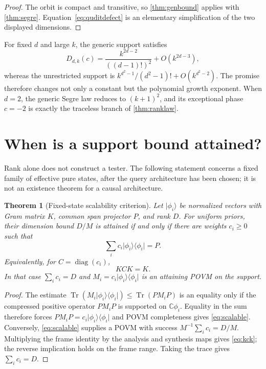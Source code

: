 \documentclass[11pt]{article}
\newtheorem{theorem}{Theorem}[section]
\theoremstyle{definition}
\theoremstyle{remark}
\newcommand{\C}{\mathbb C}
\newcommand{\Tr}{\operatorname{Tr}}
\newcommand{\ket}[1]{\lvert #1\rangle}
\newcommand{\bra}[1]{\langle #1\rvert}
\begin{document}
\begin{proof}
The orbit is compact and transitive, so \cref{thm:genbound} applies with
\cref{thm:segre}.  Equation~\eqref{eq:quditdefect} is an elementary
simplification of the two displayed dimensions.
\end{proof}

For fixed $d$ and large $k$, the generic support satisfies
\begin{equation}
 D_{d,k}(c)=\frac{k^{2d-2}}{((d-1)!)^2}+O(k^{2d-3}),
\end{equation}
whereas the unrestricted support is
$k^{d^2-1}/(d^2-1)!+O(k^{d^2-2})$.  The promise therefore changes not only a
constant but the polynomial growth exponent.  When $d=2$, the generic Segre
law reduces to $(k+1)^2$, and its exceptional phase $c=-2$ is exactly the
traceless branch of \cref{thm:ranklaw}.

\section{When is a support bound attained?}

Rank alone does not construct a tester.  The following statement concerns a
fixed family of effective pure states, after the query architecture has been
chosen; it is not an existence theorem for a causal architecture.

\begin{theorem}[Fixed-state scalability criterion]\label{thm:scalability}
Let $\ket{\phi_i}$ be normalized vectors with Gram matrix $K$, common span
projector $P$, and rank $D$.  For uniform priors, their dimension bound $D/M$
is attained if and only if there are weights $c_i\geq0$ such that
\begin{equation}\label{eq:scalable}
 \sum_i c_i\ket{\phi_i}\!\bra{\phi_i}=P.
\end{equation}
Equivalently, for $C=\operatorname{diag}(c_i)$,
\begin{equation}\label{eq:kck}
 KCK=K.
\end{equation}
In that case $\sum_i c_i=D$ and
$M_i=c_i\ket{\phi_i}\!\bra{\phi_i}$ is an attaining POVM on the support.
\end{theorem}

\begin{proof}
The estimate
$\Tr(M_i\ket{\phi_i}\!\bra{\phi_i})\leq\Tr(PM_iP)$
is an equality only if the compressed positive operator $PM_iP$ is supported
on $\C\phi_i$.  Equality in the sum therefore forces
$PM_iP=c_i\ket{\phi_i}\!\bra{\phi_i}$ and POVM completeness gives
\cref{eq:scalable}.  Conversely, \cref{eq:scalable} supplies a POVM with
success $M^{-1}\sum_i c_i=D/M$.  Multiplying the frame identity by the
analysis and synthesis maps gives \cref{eq:kck}; the reverse implication
holds on the frame range.  Taking the trace gives $\sum_i c_i=D$.
\end{proof}
\end{document}
